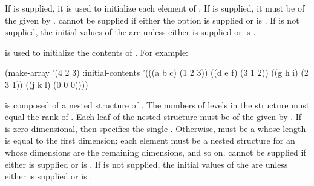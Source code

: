 If  is supplied, 
it is used to initialize each element of . 
If  is supplied,
it must be of the  given by .
 cannot be supplied if either the  option
is supplied or  is .
If  is not supplied,
the initial values of the   are 
unless either  is supplied 
or  is .

 is used to initialize the contents of .
For example:

\code
 (make-array '(4 2 3) :initial-contents
             '(((a b c) (1 2 3))
              ((d e f) (3 1 2))
              ((g h i) (2 3 1))
              ((j k l) (0 0 0))))
\endcode


 is composed of a nested structure of . 
The numbers of levels in the structure must equal the rank of .
Each leaf of the nested structure must be of the  given by . 
If  is zero-dimensional, then  specifies the single
.  Otherwise,  must be a 
whose length is equal to the first dimension; each element must be a nested 
structure for an  whose dimensions are the remaining dimensions, 
and so on.
 cannot be supplied if either 
 is supplied
or  is .
If  is not supplied, the initial values of the
  are 
unless either  is supplied
or  is .

